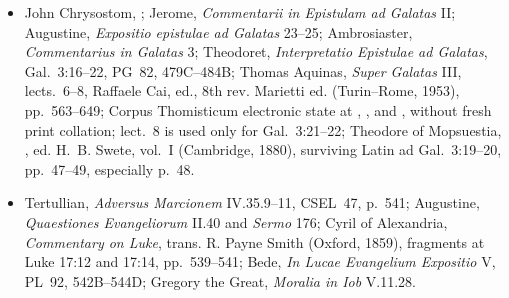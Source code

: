 {\begin{itemize}[leftmargin=1.1em,labelsep=0.35em,itemsep=0em,topsep=0.15em,parsep=0pt]
\item John Chrysostom,
; Jerome, \emph{Commentarii in Epistulam ad Galatas} II;
Augustine, \emph{Expositio epistulae ad Galatas} 23--25; Ambrosiaster,
\emph{Commentarius in Galatas} 3; Theodoret, \emph{Interpretatio Epistulae
ad Galatas}, Gal.~3:16--22, PG~82, 479C--484B; Thomas Aquinas,
\emph{Super Galatas} III, lects.~6--8, Raffaele Cai, ed., 8th rev. Marietti ed.
(Turin--Rome, 1953), pp.~563--649; Corpus Thomisticum electronic state at
,
,
and , without fresh print collation; lect.~8 is used only for
Gal.~3:21--22; Theodore of Mopsuestia,
, ed.
H.~B. Swete, vol.~I (Cambridge, 1880), surviving Latin ad Gal.~3:19--20,
pp.~47--49, especially p.~48.

\item Tertullian, \emph{Adversus Marcionem} IV.35.9--11, CSEL~47, p.~541;
Augustine, \emph{Quaestiones Evangeliorum} II.40 and \emph{Sermo} 176;
Cyril of Alexandria, \emph{Commentary on Luke}, trans. R. Payne Smith
(Oxford, 1859), fragments at Luke 17:12 and 17:14, pp.~539--541; Bede,
\emph{In Lucae Evangelium Expositio} V, PL~92, 542B--544D; Gregory the
Great, \emph{Moralia in Iob} V.11.28.


\end{itemize}}
